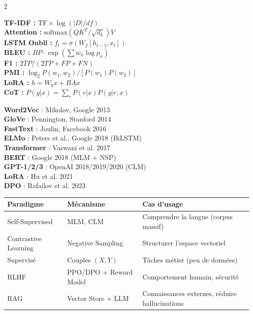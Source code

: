 \documentclass[a4paper,10pt]{article}
\begin{document}
\begin{multicols}{2}

\begin{keybox}
\textbf{TF-IDF :} $\text{TF} \times \log(|D| / df)$\\
\textbf{Attention :} $\text{softmax}(QK^T/\sqrt{d_k})V$\\
\textbf{LSTM Oubli :} $f_t = \sigma(W_f [h_{t-1}, x_t])$\\
\textbf{BLEU :} $BP \cdot \exp(\sum w_n \log p_n)$\\
\textbf{F1 :} $2TP / (2TP + FP + FN)$\\
\textbf{PMI :} $\log_2 P(w_1,w_2)/[P(w_1)P(w_2)]$\\
\textbf{LoRA :} $h = W_0 x + BAx$\\
\textbf{CoT :} $P(y|x) = \sum_r P(r|x) P(y|r,x)$
\end{keybox}

\columnbreak

\begin{keybox}
\textbf{Word2Vec} : Mikolov, Google 2013\\
\textbf{GloVe} : Pennington, Stanford 2014\\
\textbf{FastText} : Joulin, Facebook 2016\\
\textbf{ELMo} : Peters et al., Google 2018 (BiLSTM)\\
\textbf{Transformer} : Vaswani et al. 2017\\
\textbf{BERT} : Google 2018 (MLM + NSP)\\
\textbf{GPT-1/2/3} : OpenAI 2018/2019/2020 (CLM)\\
\textbf{LoRA} : Hu et al. 2021\\
\textbf{DPO} : Rafailov et al. 2023
\end{keybox}

\end{multicols}

\begin{keybox}
\begin{center}
\small
\begin{tabular}{lll}
\toprule
\textbf{Paradigme} & \textbf{Mécanisme} & \textbf{Cas d'usage} \\
\midrule
Self-Supervised & MLM, CLM & Comprendre la langue (corpus massif) \\
Contrastive Learning & Negative Sampling & Structurer l'espace vectoriel \\
Supervisé & Couples $(X, Y)$ & Tâches métier (peu de données) \\
RLHF & PPO/DPO + Reward Model & Comportement humain, sécurité \\
RAG & Vector Store + LLM & Connaissances externes, réduire hallucinations \\
\bottomrule
\end{tabular}
\end{center}
\end{keybox}
\end{document}
